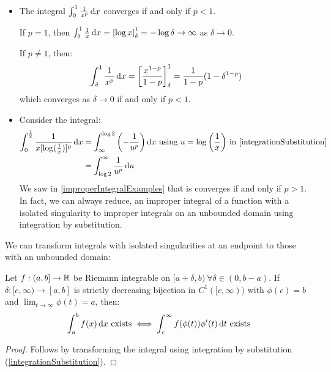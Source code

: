 \documentclass[../main.tex]{subfiles}
\begin{document}
\begin{example}
  \begin{itemize}
    \item The integral $\int_{0}^{1} \frac{1}{x^{p}} \d{x}$ converges if and only if $p < 1$.

      If $p = 1$, then $\int_{\delta}^{1} \frac{1}{x} \d{x} = \eval{\log x}{\delta}{1} = - \log \delta \to \infty$ as $\delta \to 0$.

      If $p \neq 1$, then:
      \[
        \int_{\delta}^{1} \frac{1}{x^{p}} \d{x} = \eval{\frac{x^{1 - p}}{1 - p}}{\delta}{1} = \frac{1}{1-p}(1 - \delta^{1 - p})
      \]
      which converges as $\delta \to 0$ if and only if $p < 1$.
    \item Consider the integral:
      \begin{align*}
        \int_{0}^{\frac{1}{2}} \frac{1}{x [\log(\frac{1}{x})]^{p}} \d{x} &= \int_{\infty}^{\log 2} \left(- \frac{1}{u^{p}}\right) \d{x} \text{ using $u = \log\left(\frac{1}{x}\right)$ in \cref{integrationSubstitution}} \\
                                                                         &= \int_{\log 2}^{\infty} \frac{1}{u^{p}} \d{u}
      \end{align*}
      We saw in \cref{improperIntegralExamples} that is converges if and only if $p > 1$.
      In fact, we can always reduce, an improper integral of a function with a isolated singularity to improper integrals on an unbounded domain using integration by substitution.
  \end{itemize}
\end{example}
We can transform integrals with isolated singularities at an endpoint to those with an unbounded domain:
\begin{lemma}
  Let $f: (a, b] \to \mathbb{R}$ be Riemann integrable on $[a + \delta, b)\ \forall \delta \in (0, b - a)$.
  If $\delta: [c, \infty) \to [a, b]$ is strictly decreasing bijection in $C^{1}([c, \infty))$ with $\phi(c) = b$ and $\lim_{t \to \infty} \phi(t) = a$, then:
  \[
    \int_{a}^{b} f(x) \d{x} \text{ exists}\iff \int_{c}^{\infty} f(\phi(t))\phi'(t) \d{t} \text{ exists}
  \]
\end{lemma}
\begin{proof}
  Follows by transforming the integral using integration by substitution (\cref{integrationSubstitution}).
\end{proof}
\end{document}
